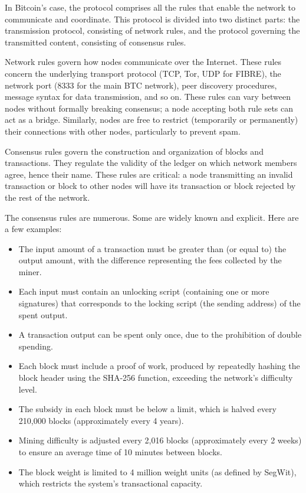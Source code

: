 \documentclass[
  a5paper,
  smalldemyvopaper,10pt,twoside,onecolumn,openright,extrafontsizes,hidelinks]{memoir}
\begin{document}
In Bitcoin's case, the protocol comprises all the rules that enable the
network to communicate and coordinate. This protocol is divided into two
distinct parts: the transmission protocol, consisting of network rules,
and the protocol governing the transmitted content, consisting of
consensus rules.

Network rules govern how nodes communicate over the Internet. These
rules concern the underlying transport protocol (TCP, Tor, UDP for
FIBRE), the network port (8333 for the main BTC network), peer discovery
procedures, message syntax for data transmission, and so on. These rules
can vary between nodes without formally breaking consensus; a node
accepting both rule sets can act as a bridge. Similarly, nodes are free
to restrict (temporarily or permanently) their connections with other
nodes, particularly to prevent spam.

Consensus rules govern the construction and organization of blocks and
transactions. They regulate the validity of the ledger on which network
members agree, hence their name. These rules are critical: a node
transmitting an invalid transaction or block to other nodes will have
its transaction or block rejected by the rest of the network.

The consensus rules are numerous. Some are widely known and explicit.
Here are a few examples:

\begin{itemize}
\item
  The input amount of a transaction must be greater than (or equal to)
  the output amount, with the difference representing the fees collected
  by the miner.
\item
  Each input must contain an unlocking script (containing one or more
  signatures) that corresponds to the locking script (the sending
  address) of the spent output.
\item
  A transaction output can be spent only once, due to the prohibition of
  double spending.
\item
  Each block must include a proof of work, produced by repeatedly
  hashing the block header using the SHA-256 function, exceeding the
  network's difficulty level.
\item
  The subsidy in each block must be below a limit, which is halved every
  210,000 blocks (approximately every 4 years).
\item
  Mining difficulty is adjusted every 2,016 blocks (approximately every
  2 weeks) to ensure an average time of 10 minutes between blocks.
\item
  The block weight is limited to 4 million weight units (as defined by
  SegWit), which restricts the system's transactional capacity.
\end{itemize}
\end{document}

